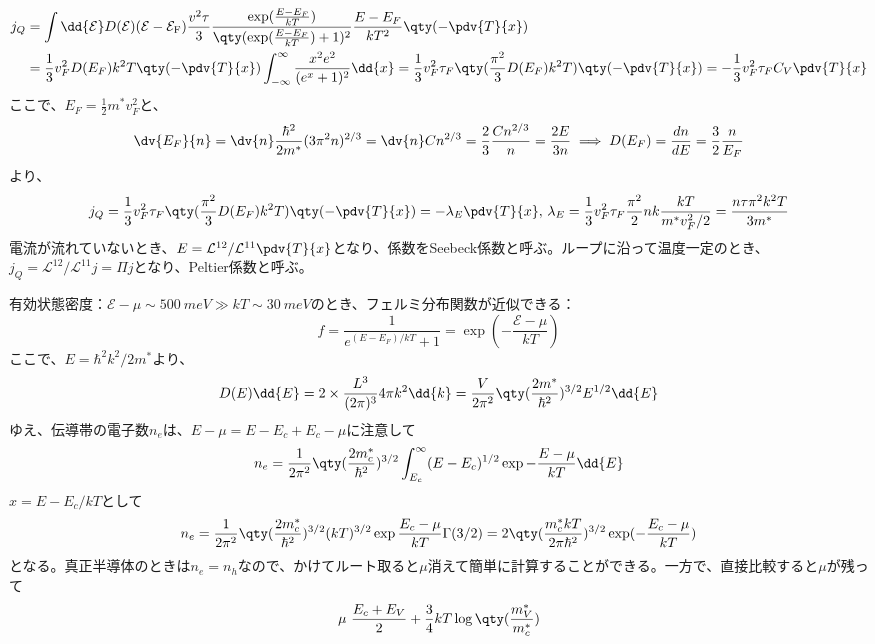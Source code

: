 \begin{align*}
	j_Q & = \int\dd{\mathcal{E}}D(\mathcal{E})(\mathcal{E}-\mathcal{E}_{\text{F}})\frac{v^2\tau}{3}\frac{\exp(\frac{E-E_F}{kT})}{\qty(\exp(\frac{E-E_F}{kT})+1)^2}\frac{E-E_F}{kT^2}\qty(-\pdv{T}{x})
	\\
	    & =\frac{1}{3}v_F^2D(E_F)k^2T\qty(-\pdv{T}{x})\int_{-\infty}^{\infty}\frac{x^2e^2}{(e^x+1)^2}\dd{x} = \frac{1}{3}v_F^2\tau_F\qty(\frac{\pi^2}{3}D(E_F)k^2T)\qty(-\pdv{T}{x})
	= -\frac{1}{3}v_F^2\tau_FC_V\pdv{T}{x}
\end{align*}
ここで、$E_F = \frac{1}{2}m^*v_F^2$と、
\begin{equation}
	\dv{E_F}{n} = \dv{n}\frac{\hbar^2}{2m^*}(3\pi^2n)^{2/3} = \dv{n}Cn^{2/3} = \frac{2}{3}\frac{Cn^{2/3}}{n} = \frac{2E}{3n} \implies D(E_F) = \frac{dn}{dE} = \frac{3}{2}\frac{n}{E_F}
\end{equation}
より、
\begin{equation}
	j_Q = \frac{1}{3}v_F^2\tau_F\qty(\frac{\pi^2}{3}D(E_F)k^2T)\qty(-\pdv{T}{x}) = -\lambda_E\pdv{T}{x} ,\,\lambda_E = \frac{1}{3}v_F^2\tau_F\frac{\pi^2}{2}nk\frac{kT}{m^*v_F^2/2} = \frac{n\tau\pi^2k^2T}{3m^*}
\end{equation}
電流が流れていないとき、$E = \mathcal{L}^{12}/\mathcal{L}^{11}\pdv{T}{x}$となり、係数をSeebeck係数と呼ぶ。ループに沿って温度一定のとき、$j_Q = \mathcal{L}^{12}/\mathcal{L}^{11}j = \Pi{}j$となり、Peltier係数と呼ぶ。

有効状態密度：$\mathcal{E}-\mu\sim\SI{500}{meV} \gg kT\sim\SI{30}{meV}$のとき、フェルミ分布関数が近似できる：
\begin{equation}
	f = \frac{1}{e^{{(E-E_F)}/{kT}} +1} = \exp(-\frac{\mathcal{E}-\mu}{kT})
\end{equation}
ここで、$E = \hbar^2k^2/2m^*$より、
\begin{equation}
	D(E)\dd{E} = 2\times\frac{L^3}{(2\pi)^3}4\pi{}k^2\dd{k} = \frac{V}{2\pi^2}\qty(\frac{2m^*}{\hbar^2})^{3/2}E^{1/2}\dd{E}
\end{equation}
ゆえ、伝導帯の電子数$n_e$は、$E-\mu = E-E_c + E_c -\mu$に注意して
\begin{equation}
	n_e = \frac{1}{2\pi^2}\qty(\frac{2m^*_c}{\hbar^2})^{3/2}\int_{E_c}^{\infty}(E-E_c)^{1/2}\exp{-\frac{E-\mu}{kT}}\dd{E}
\end{equation}
$x = E-E_c/kT$として
\begin{equation}
	n_e = \frac{1}{2\pi^2}\qty(\frac{2m^*_c}{\hbar^2})^{3/2}(kT)^{3/2}\exp{\frac{E_c-\mu}{kT}}\Gamma(3/2) = 2\qty(\frac{m^*_ckT}{2\pi\hbar^2})^{3/2}\exp(-\frac{E_c-\mu}{kT})
\end{equation}
となる。真正半導体のときは$n_e=n_h$なので、かけてルート取ると$\mu$消えて簡単に計算することができる。一方で、直接比較すると$\mu$が残って
\begin{equation}
	\mu ~ \frac{E_c+E_V}{2} + \frac{3}{4}kT\log\qty(\frac{m^*_V}{m^*_c})
\end{equation}




